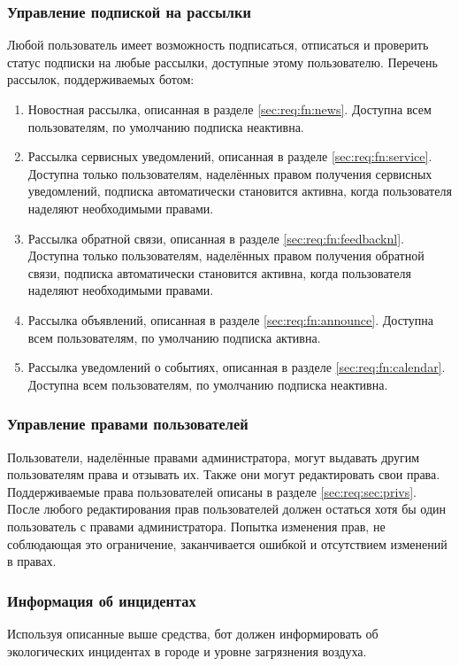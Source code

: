 \subsubsection{Управление подпиской на рассылки}
    \label{sec:req:fn:subscriptions}
    Любой пользователь имеет возможность подписаться, отписаться и проверить статус подписки на
    любые рассылки, доступные этому пользователю. Перечень рассылок, поддерживаемых ботом:
    \begin{enumerate}
        \item
            Новостная рассылка, описанная в разделе \ref{sec:req:fn:news}.
            Доступна всем пользователям, по умолчанию подписка неактивна.
        \item
            Рассылка сервисных уведомлений, описанная в разделе \ref{sec:req:fn:service}.
            Доступна только пользователям, наделённых правом получения сервисных уведомлений,
            подписка автоматически становится активна, когда пользователя
            наделяют необходимыми правами.
        \item
            Рассылка обратной связи, описанная в разделе \ref{sec:req:fn:feedbacknl}.
            Доступна только пользователям, наделённых правом получения обратной связи,
            подписка автоматически становится активна, когда пользователя
            наделяют необходимыми правами.
        \item
            Рассылка объявлений, описанная в разделе \ref{sec:req:fn:announce}.
            Доступна всем пользователям, по умолчанию подписка активна.
        \item
            Рассылка уведомлений о событиях, описанная в разделе \ref{sec:req:fn:calendar}.
            Доступна всем пользователям, по умолчанию подписка неактивна.
    \end{enumerate}

\subsubsection{Управление правами пользователей}
    \label{seq:req:fn:roles}
    Пользователи, наделённые правами администратора, могут выдавать другим
    пользователям права и отзывать их. Также они могут редактировать свои права.
    Поддерживаемые права пользователей описаны в разделе \ref{sec:req:sec:privs}.
    После любого редактирования прав пользователей должен остаться хотя бы один
    пользователь с правами администратора. Попытка изменения прав, не соблюдающая
    это ограничение, заканчивается ошибкой и отсутствием изменений в правах.

\subsubsection{Информация об инцидентах}
    \label{sec:req:fn:incidents}
        Используя описанные выше средства, бот должен информировать об экологических инцидентах
        в городе и уровне загрязнения воздуха.
